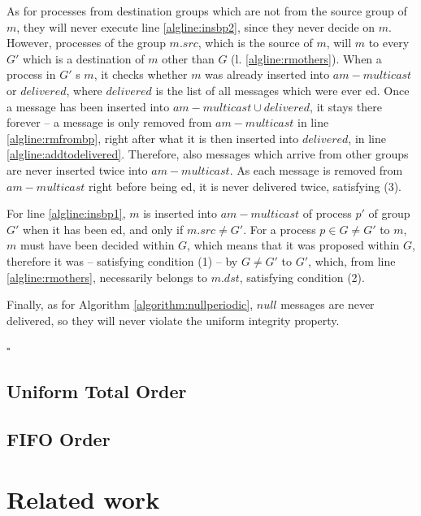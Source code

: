 \documentclass[times, 10pt]{article}
\begin{document}
As for processes from destination groups which are not from the source group of $m$, they will never execute line \ref{algline:insbp2}, since they never decide on $m$. However, processes of the group $m.src$, which is the source of $m$, will \rmcast{} $m$ to every $G'$ which is a destination of $m$ other than $G$ (l. \ref{algline:rmothers}). When a process in $G'$ \rmdel{}s $m$, it checks whether $m$ was already inserted into $am-multicast$ or $delivered$, where $delivered$ is the list of all messages which were ever \amdel{}ed. Once a message has been inserted into \mbox{$am-multicast \cup delivered$}, it stays there forever -- a message is only removed from $am-multicast$ in line \ref{algline:rmfrombp}, right after what it is then inserted into $delivered$, in line \ref{algline:addtodelivered}. Therefore, also messages which arrive from other groups are never inserted twice into $am-multicast$. As each message is removed from $am-multicast$ right before being \amdel{}ed, it is never delivered twice, satisfying (3).

For line \ref{algline:insbp1}, $m$ is inserted into $am-multicast$ of process $p'$ of group $G'$ when it has been \rmdel{}ed, and only if $m.src \neq G'$. For a process $p \in G \neq G'$ to \rmcast{} $m$, $m$ must have been decided within $G$, which means that it was proposed within $G$, therefore it was \amcast{} -- satisfying condition (1) -- by $G \neq G'$ to $G'$, which, from line \ref{algline:rmothers}, necessarily belongs to $m.dst$, satisfying condition (2).

Finally, as for Algorithm \ref{algorithm:nullperiodic}, $null$ messages are never delivered, so they will never violate the uniform integrity property.

\begin{flushright}
$\square$
\end{flushright}

\subsection{Uniform Total Order}

\subsection{FIFO Order}

\section{Related work}
\end{document}
